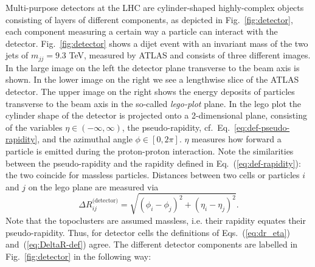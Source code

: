 Multi-purpose detectors at the LHC are cylinder-shaped highly-complex
objects consisting of layers of different components, as depicted in
Fig.~\ref{fig:detector}, each component measuring a certain way a
particle can interact with the detector. Fig.~\ref{fig:detector} shows
a dijet event with an invariant mass of the two jets of $m_{jj} = 9.3$
TeV, measured by ATLAS and consists of three different images. In the
large image on the left the detector plane transverse to the beam axis
is shown. In the lower image on the right we see a lengthwise slice of
the ATLAS detector. The upper image on the right shows the energy
deposits of particles transverse to the beam axis in the so-called
{\it lego-plot} plane. In the lego plot the cylinder shape of the
detector is projected onto a 2-dimensional plane, consisting of the
variables $\eta \in (-\infty, \infty)$, the pseudo-rapidity, cf.\
Eq.~\eqref{eq:def-pseudo-rapidity}, and the azimuthal angle $\phi \in
[0,2 \pi]$.
% 
$\eta$ measures how forward a particle is emitted during the proton-proton interaction. 
Note the similarities between the pseudo-rapidity and the rapidity defined in Eq.~(\ref{eq:def-rapidity}): the two coincide for massless particles. 
%
Distances between two cells or particles $i$ and $j$ on the lego plane are measured via 
\begin{equation}
\Delta R_{ij}^{\text{(detector)}} = \sqrt{(\phi_i - \phi_j)^2 + (\eta_i -\eta_j)^2 }.
\label{eq:dr_eta}
\end{equation}
Note that the topoclusters are assumed massless, i.e. their rapidity equates their pseudo-rapidity. Thus, for detector cells the definitions of Eqs.~(\ref{eq:dr_eta}) and~(\ref{eq:DeltaR-def}) agree.
The different detector components are labelled in Fig.~\ref{fig:detector} in the following way:
